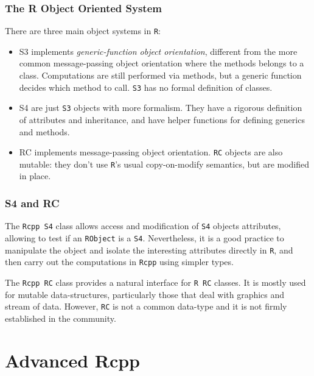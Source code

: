 \documentclass{beamer}
\def\code#1{\texttt{#1}} %
\begin{document}
\begin{frame}
\frametitle{The R Object Oriented System}

There are three main object systems in \code{R}:
\begin{itemize}
	\item<1-> \alert{S3} implements \emph{generic-function object orientation}, different from the more common message-passing object orientation where the methods belongs to a class. Computations are still performed via methods, but a generic function decides which method to call. \code{S3} has no formal definition of classes.
	\item<2-> \alert{S4} are just \code{S3} objects with more formalism. They have a rigorous definition of attributes and inheritance, and have helper functions for defining generics and methods. 
	\item<3-> \alert{RC} implements message-passing object orientation. \code{RC} objects are also mutable: they don’t use \code{R}’s usual copy-on-modify semantics, but are modified in place. 
\end{itemize}

\end{frame}


\begin{frame}
	\frametitle{S4 and RC}

The \alert{\code{Rcpp S4}} class allows access and modification of \code{S4} objects attributes, allowing to test if an \code{RObject} is a \code{S4}. Nevertheless, it is a good practice to manipulate the object and isolate the interesting attributes directly in \code{R}, and then carry out the computations in \code{Rcpp} using simpler types.
\bigskip

The \alert{\code{Rcpp RC}} class provides a natural interface for \code{R RC} classes. It is mostly used for mutable data-structures, particularly those that deal with graphics and stream of data. However, \code{RC} is not a common data-type and it is not firmly established in the community. 

\end{frame}



\section{Advanced Rcpp}

\end{document}
